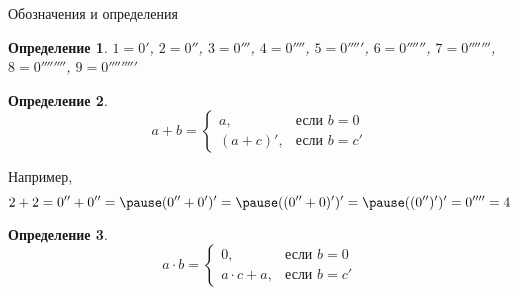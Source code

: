 \documentclass[aspectratio=169]{beamer}
\newtheorem{dfn}{Определение}[section]
\begin{document}
\begin{frame}{Обозначения и определения}
\begin{dfn}
$1 = 0'$, $2 = 0''$, $3 = 0'''$, $4 = 0''''$, $5 = 0'''''$, $6 = 0''''''$,
$7 = 0'''''''$, $8 = 0''''''''$, $9 = 0'''''''''$
\end{dfn}\pause
\begin{dfn}\vspace{-0.3cm}
$$a + b = \left\{ \begin{array}{ll} a, & \mbox{если } b = 0\\
                                    (a + c)', & \mbox{если } b = c'
                  \end{array}\right.$$
\end{dfn}\pause\vspace{-0.3cm}
Например, $$2 + 2 = 0'' + 0'' = \pause (0'' + 0')' = \pause ((0'' + 0)')' = \pause ((0'')')' = 0'''' = 4$$\pause\vspace{-0.3cm}
\begin{dfn}\vspace{-0.3cm}
$$a \cdot b = \left\{ \begin{array}{ll} 0, & \mbox{если } b = 0\\
                                    a \cdot c + a, & \mbox{если } b = c'
                  \end{array}\right.$$
\end{dfn}
\end{frame}
\end{document}
